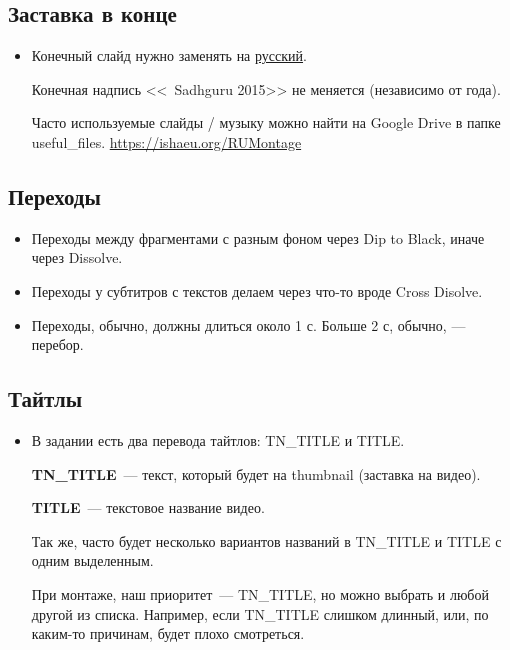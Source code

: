 \documentclass[
a4paper, %
12pt, %
article,
onecolumn, %
openany, %
]{memoir}
\begin{document}
\subsection{Заставка в конце}

\begin{itemize}
    \item Конечный слайд нужно заменять на
        \href{https://drive.google.com/file/d/11NbSgvq8LbxDcy-a2WY5OJTKUZKcZx88/view?usp=sharing}{русский}.

        Конечная надпись <<\textcopyright\ Sadhguru 2015>> не меняется (независимо от года).

        Часто используемые слайды / музыку можно найти на Google Drive в папке
        useful\_files.
        \href{https://ishaeu.org/RUMontage}{https://ishaeu.org/RUMontage}
\end{itemize}


\subsection{Переходы}
\begin{itemize}
    \item Переходы между фрагментами с разным фоном через Dip to Black, иначе через Dissolve.
    \item Переходы у субтитров с текстов делаем через что-то вроде Cross Disolve.
    \item Переходы, обычно, должны длиться около 1 с.
        Больше 2 с, обычно, --- перебор.
\end{itemize}

\subsection{Тайтлы}
\begin{itemize}
    \item В задании есть два перевода тайтлов:
        TN\_TITLE и TITLE.

        \textbf{TN\_TITLE}~--- текст, который будет на
        thumbnail (заставка на видео).

        \textbf{TITLE}~--- текстовое название видео.

        Так же, часто будет несколько вариантов названий
        в TN\_TITLE и TITLE с одним выделенным.

        При монтаже, наш
        приоритет~--- TN\_TITLE, но можно выбрать и любой другой
        из списка. Например, если TN\_TITLE слишком длинный,
        или, по каким-то причинам, будет плохо смотреться.
\end{itemize}
\end{document}
